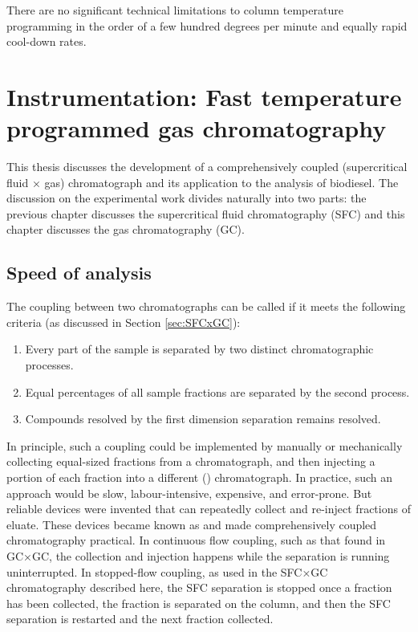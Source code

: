 
\begin{savequote}[\quotewidth] There are no significant technical limitations to column
temperature programming in the order of a few hundred degrees per minute and
equally rapid cool-down rates.
\end{savequote}

\chapter[Instrumentation: Fast GC]{Instrumentation: Fast temperature programmed gas chromatography} %

\label{Chapter5} %

This thesis discusses the development of a comprehensively coupled
(supercritical fluid × gas) chromatograph and its application to the analysis of
biodiesel. The discussion on the experimental work divides naturally into two
parts: the previous chapter discusses the supercritical fluid chromatography
(SFC) and this chapter discusses the gas chromatography (GC).

\section{Speed of analysis}

The coupling between two chromatographs can be called  if
it meets the following criteria (as discussed in Section \ref{sec:SFCxGC}):
\begin{enumerate}
  \item Every part of the sample is separated by two distinct chromatographic processes.
  \item Equal percentages of all sample fractions are separated by the second process.	 
  \item Compounds resolved by the first dimension separation remains resolved.  
\end{enumerate} 

In principle, such a coupling could be implemented by manually or mechanically
collecting equal-sized fractions from a \oneD chromatograph, and then injecting
a portion of each fraction into a different (\twoD) chromatograph. In practice,
such an approach would be slow, labour-intensive, expensive, and error-prone.
But reliable devices were invented that can repeatedly collect and re-inject
fractions of eluate. These devices became known as  and made
comprehensively coupled chromatography practical. In continuous flow coupling,
such as that found in GC×GC, the collection and injection happens while the
\oneD separation is running uninterrupted. In stopped-flow coupling, as used in
the SFC×GC chromatography described here, the \oneD SFC separation is stopped
once a fraction has been collected, the fraction is separated on the \twoD
column, and then the SFC separation is restarted and the next fraction
collected.

